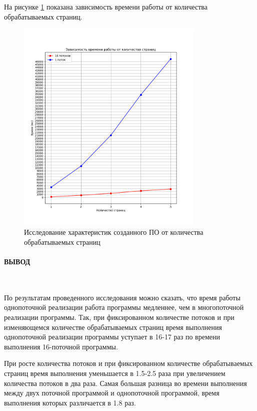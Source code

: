 На рисунке \ref{fig:image2} показана зависимость времени работы от количества
обрабатываемых страниц.

\begin{figure}[h!]
    \centering
    \includegraphics[width=0.8\textwidth]{images/image2}
    \caption{Исследование характеристик созданного ПО от количества обрабатываемых страниц}
    \label{fig:image2}
\end{figure}

\clearpage

\paragraph*{ВЫВОД} ${}$ \newline

По результатам проведенного исследования можно сказать, что время работы
однопоточной реализации работа программы медленнее, чем в многопоточной
реализации программы. Так, при фиксированном количестве потоков и при изменяющемся
количестве обрабатываемых страниц время выполнения однопоточной реализации программы
уступает в 16-17 раз по времени выполнения 16-поточной программы.

При росте количества потоков и при фиксированном количестве обрабатываемых
страниц время выполнения
уменьшается в 1.5-2.5 раза при увеличением количества потоков в два раза.
Самая большая разница во времени выполнения между двух поточной программой
и однопоточной программой, время выполнения которых различается в 1.8 раз. 


